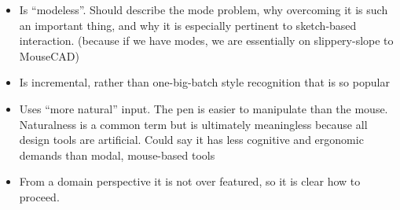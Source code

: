 \begin{itemize}
\item Is ``modeless''. Should describe the mode problem, why
  overcoming it is such an important thing, and why it is especially
  pertinent to sketch-based interaction. (because if we have modes, we
  are essentially on slippery-slope to MouseCAD)
\item Is incremental, rather than one-big-batch style recognition that
  is so popular
\item Uses ``more natural'' input. The pen is easier to manipulate
  than the mouse. Naturalness is a common term but is ultimately
  meaningless because all design tools are artificial. Could say it
  has less cognitive and ergonomic demands than modal, mouse-based
  tools
\item From a domain perspective it is not over featured, so it is
  clear how to proceed.
\end{itemize}
